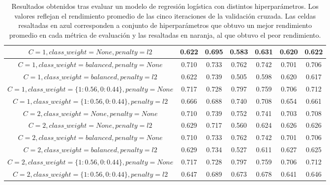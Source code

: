 \begin{table}[h!]
\begin{adjustbox}{max width=\textwidth}
\begin{tabular}{ *{7}{|c}| }
    \hline
    $C=1, class\_weight=None, penalty=l2$ & 0.622 & 0.695 & 0.583 & 0.631 & 0.620 & 0.622 \\
    \hline
    $C=1, class\_weight=balanced, penalty=None$ & 0.710 & 0.733 & 0.762 & 0.742 & 0.701 & 0.706 \\
    \hline
    $C=1, class\_weight=balanced, penalty=l2$ & 0.622 & 0.739 & 0.505 & 0.598 & 0.620 & 0.617 \\
    \hline
    $C=1, class\_weight=\lbrace1: 0.56, 0: 0.44\rbrace, penalty=None$ & 0.717 & 0.728 & 0.797 & 0.759 & 0.706 & 0.712 \\
    \hline
    $C=1, class\_weight=\lbrace1: 0.56, 0: 0.44\rbrace, penalty=l2$ & 0.666 & 0.688 & 0.740 & 0.708 & 0.654 & 0.661 \\
    \hline
    $C=2, class\_weight=None, penalty=None$ & 0.710 & 0.739 & 0.752 & 0.741 & 0.703 & 0.708 \\
    \hline
    $C=2, class\_weight=None, penalty=l2$ & 0.629 & 0.717 & 0.560 & 0.624 & 0.626 & 0.626 \\
    \hline
    $C=2, class\_weight=balanced, penalty=None$ & 0.710 & 0.733 & 0.762 & 0.742 & 0.701 & 0.706 \\
    \hline
    $C=2, class\_weight=balanced, penalty=l2$ & 0.629 & 0.734 & 0.527 & 0.611 & 0.627 & 0.625 \\
    \hline
    $C=2, class\_weight=\lbrace1: 0.56, 0: 0.44\rbrace, penalty=None$ & 0.717 & 0.728 & 0.797 & 0.759 & 0.706 & 0.712 \\
    \hline
    $C=2, class\_weight=\lbrace1: 0.56, 0: 0.44\rbrace, penalty=l2$ & 0.647 & 0.689 & 0.673 & 0.678 & 0.641 & 0.646 \\
    \hline
\end{tabular}
\end{adjustbox}
\caption{Resultados obtenidos tras evaluar un modelo de regresi\'on log\'istica con
distintos hiperpar\'ametros. Los valores reflejan el rendimiento promedio de las
cinco iteraciones de la validaci\'on cruzada. Las celdas resaltadas en azul
corresponden a conjunto de hiperpar\'ametros que obtuvo un mejor rendimiento
promedio en cada m\'etrica de evaluaci\'on y las resaltadas en naranja, al
que obtuvo el peor rendimiento.}
\label{table-results-models-params}
\end{table}


